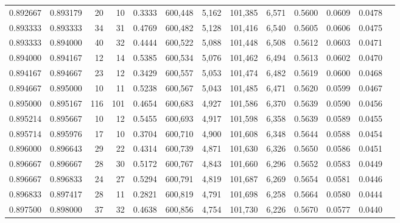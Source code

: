 \begin{tabular}{rrrrrrrrrrrrr}
0.892667 & 0.893179 &    20 &  10 &                                     0.3333 & 600,448 &   5,162 & 101,385 &   6,571 & 0.5600 & 0.0609 & 0.0478 \\
0.893333 & 0.893333 &    34 &  31 &                                     0.4769 & 600,482 &   5,128 & 101,416 &   6,540 & 0.5605 & 0.0606 & 0.0475 \\
0.893333 & 0.894000 &    40 &  32 &                                     0.4444 & 600,522 &   5,088 & 101,448 &   6,508 & 0.5612 & 0.0603 & 0.0471 \\
0.894000 & 0.894167 &    12 &  14 &                                     0.5385 & 600,534 &   5,076 & 101,462 &   6,494 & 0.5613 & 0.0602 & 0.0470 \\
0.894167 & 0.894667 &    23 &  12 &                                     0.3429 & 600,557 &   5,053 & 101,474 &   6,482 & 0.5619 & 0.0600 & 0.0468 \\
0.894667 & 0.895000 &    10 &  11 &                                     0.5238 & 600,567 &   5,043 & 101,485 &   6,471 & 0.5620 & 0.0599 & 0.0467 \\
0.895000 & 0.895167 &   116 & 101 &                                     0.4654 & 600,683 &   4,927 & 101,586 &   6,370 & 0.5639 & 0.0590 & 0.0456 \\
0.895214 & 0.895667 &    10 &  12 &                                     0.5455 & 600,693 &   4,917 & 101,598 &   6,358 & 0.5639 & 0.0589 & 0.0455 \\
0.895714 & 0.895976 &    17 &  10 &                                     0.3704 & 600,710 &   4,900 & 101,608 &   6,348 & 0.5644 & 0.0588 & 0.0454 \\
0.896000 & 0.896643 &    29 &  22 &                                     0.4314 & 600,739 &   4,871 & 101,630 &   6,326 & 0.5650 & 0.0586 & 0.0451 \\
0.896667 & 0.896667 &    28 &  30 &                                     0.5172 & 600,767 &   4,843 & 101,660 &   6,296 & 0.5652 & 0.0583 & 0.0449 \\
0.896667 & 0.896833 &    24 &  27 &                                     0.5294 & 600,791 &   4,819 & 101,687 &   6,269 & 0.5654 & 0.0581 & 0.0446 \\
0.896833 & 0.897417 &    28 &  11 &                                     0.2821 & 600,819 &   4,791 & 101,698 &   6,258 & 0.5664 & 0.0580 & 0.0444 \\
0.897500 & 0.898000 &    37 &  32 &                                     0.4638 & 600,856 &   4,754 & 101,730 &   6,226 & 0.5670 & 0.0577 & 0.0440 \\

\end{tabular}
